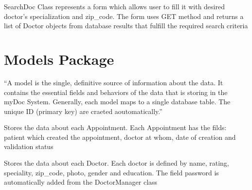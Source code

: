\documentclass[letterpaper,10pt,english]{sphinxmanual}
\begin{document}

\begin{fulllineitems}
\label{forms:doctors.forms.SearchDoc}
SearchDoc Class represents a form which allows user to fill it with desired doctor's specialization and zip\_code. The form uses GET method and returns a list of Doctor objects from database results that fulfill the required search criteria

\end{fulllineitems}



\chapter{Models Package}
\label{models:models-package}\label{models::doc}
``A model is the single, definitive source of information about the data. It contains the essential fields and behaviors of the data that is storing in the myDoc System. Generally, each model maps to a single database table. The unique ID (primary key) are craeted aoutomatically.''
\label{models:module-doctors.models}

\begin{fulllineitems}
\label{models:doctors.models.Appointment}
Stores the data about each Appointment. Each Appointment has the filds: patient which created the appointment, doctor at whom, date of creation and validation status

\end{fulllineitems}


\begin{fulllineitems}
\label{models:doctors.models.Doctor}
Stores the data about each Doctor. Each doctor is defined by name, rating, speciality, zip\_code, photo, gender and education. The field password is automatically added from the DoctorManager class

\end{fulllineitems}
\end{document}

